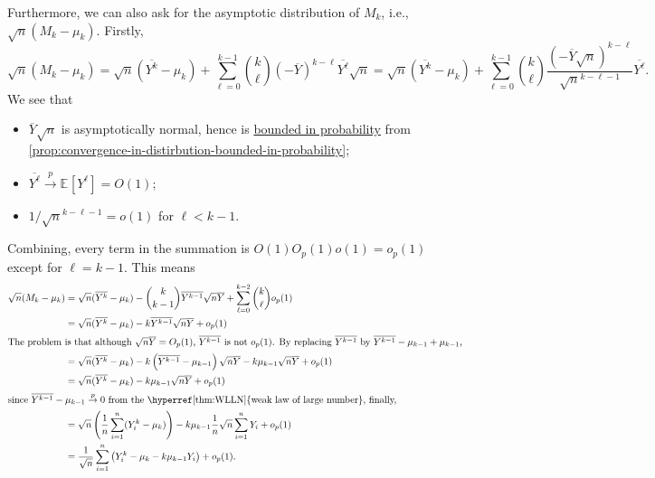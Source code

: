 Furthermore, we can also ask for the asymptotic distribution of \(M_k\), i.e., \(\sqrt{n} (M_k - \mu _k)\). Firstly,
\[
	\sqrt{n} (M_k - \mu _k)
	= \sqrt{n} (\overline{Y^k} - \mu _k ) + \sum_{\ell =0}^{k-1} \binom{k}{\ell } (- \overline{Y} )^{k-\ell } \overline{Y^{\ell } } \sqrt{n}
	= \sqrt{n} (\overline{Y^k} - \mu _k ) + \sum_{\ell =0}^{k-1} \binom{k}{\ell } \frac{(- \overline{Y} \sqrt{n} )^{k-\ell }}{\sqrt{n} ^{k - \ell - 1}} \overline{Y^{\ell } }.
\]
We see that
\begin{itemize}
	\item \(\overline{Y} \sqrt{n} \) is asymptotically normal, hence is \hyperref[def:bounded-in-probability]{bounded in probability} from \autoref{prop:convergence-in-distirbution-bounded-in-probability};
	\item \(\overline{Y^{\ell } } \overset{p}{\to} \mathbb{E}_{}[Y^{\ell } ] = O(1)\);
	\item \(1 / \sqrt{n} ^{k - \ell - 1} = o(1)\) for \(\ell < k-1\).
\end{itemize}
Combining, every term in the summation is \(O(1) O_p(1) o(1) = o_p(1)\) except for \(\ell = k-1\). This means
\begin{align*}
	\sqrt{n} (M_k - \mu _k)
	 & = \sqrt{n} (\overline{Y^k} - \mu _k) - \binom{k}{k-1} \overline{Y^{k-1}} \sqrt{n} \overline{Y} + \sum_{\ell =0}^{k-2} \binom{k}{\ell } o_p(1)               \\
	 & = \sqrt{n} (\overline{Y^k} - \mu _k) - k \overline{Y^{k-1}} \sqrt{n} \overline{Y} + o_p(1)                                                                  \\
	\shortintertext{The problem is that although \(\sqrt{n} \overline{Y} = O_p(1)\), \(\overline{Y^{k-1}} \) is not \(o_p(1)\). By replacing \(\overline{Y^{k-1} } \) by \(\overline{Y^{k-1}} - \mu _{k-1} + \mu _{k-1}\),}
	 & = \sqrt{n} (\overline{Y^k} - \mu _k) - k \left( \overline{Y^{k-1}} - \mu _{k-1} \right) \sqrt{n} \overline{Y} - k \mu _{k-1} \sqrt{n} \overline{Y} + o_p(1) \\
	 & = \sqrt{n} (\overline{Y^k} - \mu _k) - k \mu _{k-1} \sqrt{n} \overline{Y} + o_p(1)                                                                          \\
	\shortintertext{since \(\overline{Y^{k-1}} - \mu _{k-1} \overset{p}{\to} 0\) from the \hyperref[thm:WLLN]{weak law of large number}, finally,}
	 & =\sqrt{n} \left( \frac{1}{n} \sum_{i=1}^{n} (Y_i^k - \mu _k) \right)  - k \mu _{k-1} \frac{1}{n} \sqrt{n} \sum_{i=1}^{n} Y_i  + o_p(1)                      \\
	 & = \frac{1}{\sqrt{n} } \sum_{i=1}^{n} \left( Y_i^k - \mu _k - k \mu _{k-1} Y_i \right) + o_p(1).
\end{align*}
